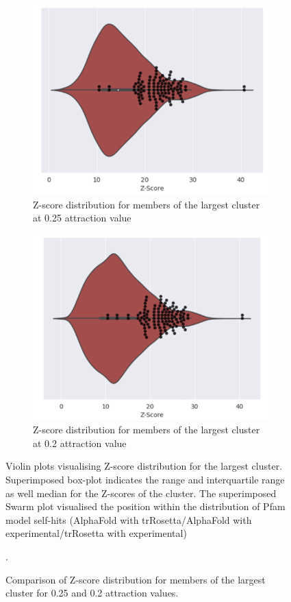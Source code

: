 \begin{figure}[htb]
    \centering %
\begin{subfigure}{0.4\textwidth}
  \includegraphics[width=\linewidth]{Pfam/att_val_1.png}
  \caption{Z-score distribution for members of the largest cluster at 0.25 attraction value}
  \label{fig:att1}
\end{subfigure}\hfil %
\begin{subfigure}{0.4\textwidth}
  \includegraphics[width=\linewidth]{Pfam/att_val_2.png}
  \caption{Z-score distribution for members of the largest cluster at 0.2 attraction value}
  \label{fig:att2}
\end{subfigure}
\caption{Comparison of Z-score distribution for members of the largest cluster for 0.25 and 0.2 attraction values.}
\small
\begin{flushleft}Violin plots visualising Z-score distribution for the largest cluster.  Superimposed box-plot indicates the range and interquartile range as well median for the Z-scores of the cluster. The superimposed Swarm plot visualised the position within the distribution of Pfam model self-hits (AlphaFold with trRosetta/AlphaFold with experimental/trRosetta with experimental)\end{flushleft}.
\label{fig:att_values}
\end{figure}
